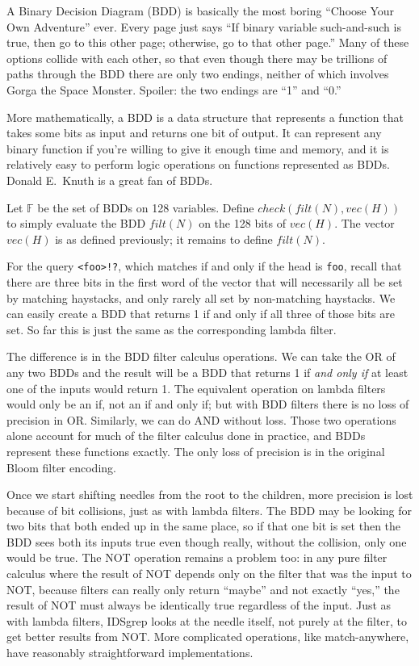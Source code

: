 \documentclass[twocolumn]{report}
\begin{document}
A Binary Decision Diagram (BDD) is basically the most boring ``Choose Your
Own Adventure'' ever.  Every page just says ``If binary variable
such-and-such is true, then go to this other page; otherwise, go to that
other page.'' Many of these options collide with each other, so that even
though there may be trillions of paths through the BDD there are only two
endings, neither of which involves Gorga the Space Monster.  Spoiler: the
two endings are ``1'' and ``0.''

More mathematically, a BDD is a data structure that represents a function
that takes some bits as input and returns one bit of output.  It can
represent any binary function if you're willing to give it enough time and
memory, and it is relatively easy to perform logic operations on functions
represented as BDDs.  Donald E.\ Knuth is a great fan of BDDs.

Let $\mathbb{F}$ be the set of BDDs on 128 variables.  Define
$\mathit{check}(\mathit{filt}(N),\mathit{vec}(H))$ to simply evaluate the
BDD $\mathit{filt}(N)$ on the 128 bits of $\mathit{vec}(H)$.  The vector
$\mathit{vec}(H)$ is as defined previously; it remains to define
$\mathit{filt}(N)$.

For the query \texttt{<foo>!?}, which matches if and only if the head is
\texttt{foo}, recall that there are three bits in the first word of the
vector that will necessarily all be set by matching haystacks, and only rarely
all set by non-matching haystacks.  We can easily create a BDD that
returns 1 if and only if all three of those bits are set.  So far this is
just the same as the corresponding lambda filter.

The difference is in the BDD filter calculus operations.  We can take the OR
of any two BDDs and the result will be a BDD that returns 1 if \emph{and
only if} at least one of the inputs would return 1.  The equivalent
operation on lambda filters would only be an if, not an if and only if; but
with BDD filters there is no loss of precision in OR.  Similarly, we can do
AND without loss.  Those two operations alone account for much of the filter
calculus done in practice, and BDDs represent these functions exactly.  The
only loss of precision is in the original Bloom filter encoding.

Once we start shifting needles from the root to the children, more precision
is lost because of bit collisions, just as with lambda filters.  The BDD may
be looking for two bits that both ended up in the same place, so if that one
bit is set then the BDD sees both its inputs true even though really,
without the collision, only one would be true.  The NOT operation remains a
problem too: in any pure filter calculus where the result of NOT depends
only on the filter that was the input to NOT, because filters can really
only return ``maybe'' and not exactly ``yes,'' the result of NOT must
always be identically true regardless of the input.  Just as with lambda
filters, IDSgrep looks at the needle itself, not purely at the filter, to
get better results from NOT.  More complicated operations, like
match-anywhere, have reasonably straightforward implementations.
\end{document}
